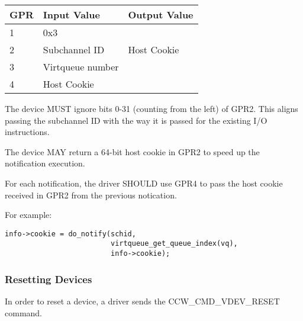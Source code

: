 \begin{tabular}{ |l|l|l| }
\hline
GPR  &   Input Value     & Output Value \\
\hline \hline
  1   &       0x3         &              \\
\hline
  2   &  Subchannel ID    & Host Cookie  \\
\hline
  3   & Virtqueue number  &              \\
\hline
  4   &   Host Cookie     &              \\
\hline
\end{tabular}

The device MUST ignore bits 0-31 (counting from the left) of GPR2.
This aligns passing the subchannel ID with the way it is passed
for the existing I/O instructions.

The device MAY return a 64-bit host cookie in GPR2 to speed up the
notification execution.


For each notification, the driver SHOULD use GPR4 to pass the host cookie received in GPR2 from the previous notication.

\begin{note}
For example:
\begin{lstlisting}
info->cookie = do_notify(schid,
                         virtqueue_get_queue_index(vq),
                         info->cookie);
\end{lstlisting}
\end{note}

\subsubsection{Resetting Devices}\label{sec:Virtio Transport Options / Virtio over channel I/O / Device Operation / Resetting Devices}

In order to reset a device, a driver sends the
CCW_CMD_VDEV_RESET command.


